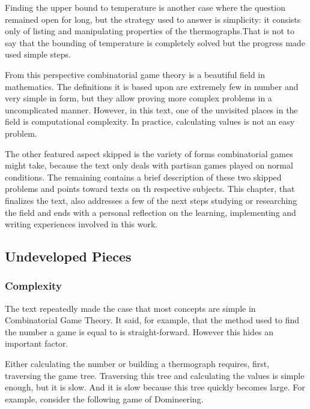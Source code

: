 Finding the upper bound to temperature is another case where the question remained open for long, but the strategy used to answer is simplicity: it consists only of listing and manipulating properties of the thermographs.That is not to say that the bounding of temperature is completely solved but the progress made used simple steps.

From this perspective combinatorial game theory is a beautiful field in mathematics. The definitions it is based upon are extremely few in number and very simple in form, but they allow proving more complex problems in a uncomplicated manner. However, in this text, one of the unvisited places in the field is computational complexity. In practice, calculating values is not an easy problem.

The other featured aspect skipped is the variety of forms combinatorial games might take, because the text only deals with partisan games played on normal conditions. The remaining contains a brief description of these two skipped problems and points toward texts on th respective subjects. This chapter, that finalizes the text, also addresses a few of the next steps studying or researching the field and ends with a personal reflection on the learning, implementing and writing experiences involved in this work.


\subsection*{Undeveloped Pieces}

\subsubsection*{Complexity}

The text repeatedly made the case that most concepts are simple in Combinatorial Game Theory. It said, for example, that the method used to find the number a game is equal to is straight-forward. However this hides an important factor.

Either calculating the number or building a thermograph requires, first, traversing the game tree. Traversing this tree and calculating the values is simple enough, but it is slow. And it is slow because this tree quickly becomes large. For example, consider the following game of Domineering.

\begin{center}
\end{center}

